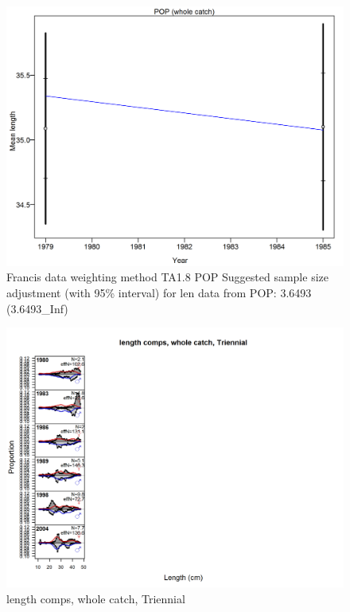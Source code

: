 \documentclass[12pt,]{article}
\begin{document}
\begin{figure}
\centering
\includegraphics{./r4ss/plots_mod1/comp_lenfit_data_weighting_TA1.8_POP.png}
\caption{Francis data weighting method TA1.8 POP Suggested sample size
adjustment (with 95\% interval) for len data from POP: 3.6493
(3.6493\_Inf) \label{fig:mod1_17_comp_lenfit_data_weighting_TA1.8_POP}}
\end{figure}

\begin{figure}
\centering
\includegraphics{./r4ss/plots_mod1/comp_lenfit_flt5mkt0.png}
\caption{length comps, whole catch, Triennial
\label{fig:mod1_18_comp_lenfit_flt5mkt0}}
\end{figure}
\end{document}
